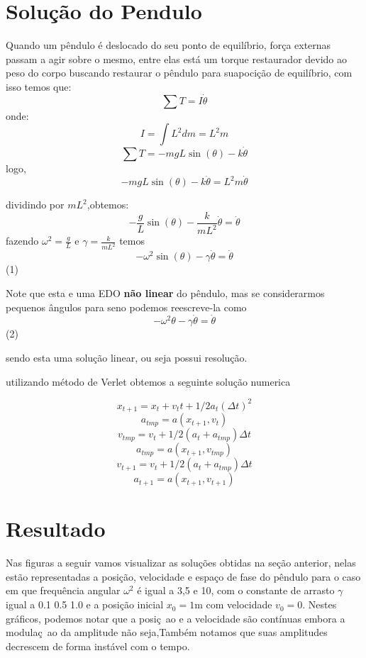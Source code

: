 \documentclass[a4paper]{article} %
\begin{document}
\section{Solu\c{c}\~ao do Pendulo}

Quando um p\^endulo \'e deslocado do seu ponto de equil\'ibrio, for\c{c}a externas passam a agir sobre o mesmo, entre elas est\'a um torque restaurador devido ao peso do corpo buscando restaurar o p\^endulo para suapoci\c{c}\~ao de equil\'ibrio, com isso temos que:
\[ \sum{T} = I\dot{\theta} \]
onde:
\[ I = \int{L^2dm} = L^2m \]
\[ \sum{T} = -mgL\sin(\theta) - k\dot{\theta} \]
logo,
\[-mgL\sin(\theta) - k\dot{\theta} = L^2m\dot{\theta}\]

dividindo por $mL^2$,obtemos:
\[-\frac{g}{L}\sin(\theta) - \frac{k}{mL^2}\dot{\theta} = \dot{\theta}\]
fazendo $\omega^2 = \frac{g}{L}$ e $\gamma = \frac{k}{mL^2}$ temos
\[-\omega^2\sin(\theta) - \gamma\dot{\theta} = \dot{\theta}\](1)

Note que esta e uma EDO \textbf{n\~ao linear} do p\^endulo, mas se considerarmos pequenos \^angulos para seno podemos reescreve-la como
\[-\omega^2\theta - \gamma\dot{\theta} = \dot{\theta}\](2)

sendo esta uma solu\c{c}\~ao linear, ou seja possui resolu\c{c}\~ao.

 utilizando m\'etodo de Verlet obtemos a seguinte solu\c{c}\~ao numerica

\[ x_{t+1} = x_t + v_tt + 1/2a_t(\Delta{t})^2 \]
\[a_{tmp} = a(x_{t+1}, v_t)\]
\[v_{tmp} = v_t + 1/2(a_t + a_{tmp})\Delta{t}\]
\[a_{tmp} = a(x_{t+1}, v_{tmp})\]
\[v_{t+1} = v_t + 1/2(a_t + a_{tmp})\Delta{t}\]
\[a_{t+1} = a(x_{t+1}, v_{t+1})\]

\section{Resultado}

Nas figuras a seguir vamos visualizar as solu\c{c}\~oes obtidas na se\c{c}\~ao anterior, nelas est\~ao representadas a posi\c{c}\~ao, velocidade e espa\c{c}o de fase do p\^endulo para o caso em que frequ\^encia angular $\omega^2$ \'e igual a 3,5 e 10, com o constante de arrasto $\gamma$ igual a 0.1 0.5 1.0 e a  posi\c{c}\~ao inicial $x_0 = 1$m com velocidade $v_0 = 0$. Nestes gr\'aficos, podemos notar que a posi\c{c}~ao e a velocidade s\~ao cont\'inuas embora a modula\c{c}~ao da amplitude n\~ao seja,Tamb\'em notamos que suas amplitudes decrescem de forma inst\'avel com o tempo.
\end{document}
